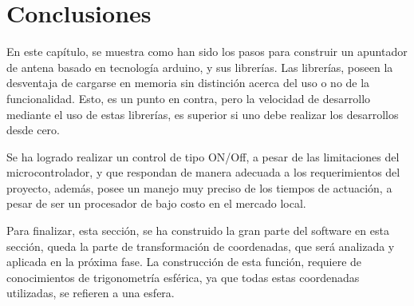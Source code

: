 \section{Conclusiones}

En este capítulo, se muestra como han sido los pasos para construir un apuntador de antena basado en tecnología arduino, y sus librerías. Las librerías, poseen la desventaja de cargarse en memoria sin distinción acerca del uso o no de la funcionalidad. Esto, es un punto en contra, pero la velocidad de desarrollo mediante el uso de estas librerías, es superior si uno debe realizar los desarrollos desde cero.  

Se ha logrado realizar un control de tipo ON/Off, a pesar de las limitaciones del microcontrolador, y que respondan de manera adecuada a los requerimientos del proyecto, además, posee un manejo muy preciso de los tiempos de actuación, a pesar de ser un procesador de bajo costo en el mercado local. 


Para finalizar, esta sección, se ha construido la gran parte del software en esta sección, queda la parte de transformación de coordenadas, que será analizada y aplicada en la próxima fase. La construcción de esta función, requiere de conocimientos de trigonometría esférica, ya que todas estas coordenadas utilizadas, se refieren a una esfera. 

